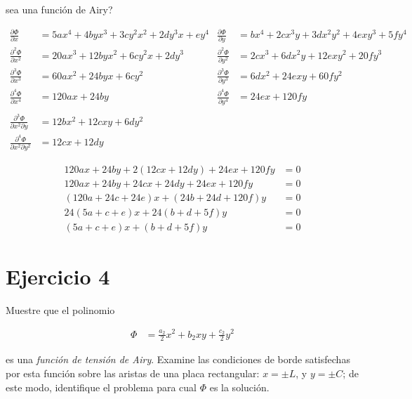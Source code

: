 \documentclass[a4paper,10pt,twoside,final,spanish]{article}
\begin{document}
\begin{enumerate}[a.]
sea una función de Airy?

\begin{tcolorbox}[colback=gray!10!white,colframe=black!0!white]

\begin{align*}
\frac{\partial\Phi}{\partial x} &= 5ax^{4}+4byx^{3}+3cy^{2}x^{2}+2dy^{3}x+ey^{4}
& \frac{\partial\Phi}{\partial y} &= bx^{4}+2cx^{3}y+3dx^{2}y^{2}+4exy^{3}+5fy^{4} \\
\frac{\partial^{2}\Phi}{\partial x^{2}} &= 20ax^{3}+12byx^{2}+6cy^{2}x+2dy^{3} 
& \frac{\partial^{2}\Phi}{\partial y^{2}} &= 2cx^{3}+6dx^{2}y+12exy^{2}+20fy^{3} \\
\frac{\partial^{3}\Phi}{\partial x^{3}} &= 60ax^{2}+24byx+6cy^{2}
& \frac{\partial^{3}\Phi}{\partial y^{3}} &= 6dx^{2}+24exy+60fy^{2} \\
\frac{\partial^{4}\Phi}{\partial x^{4}} &= 120ax+24by
& \frac{\partial^{4}\Phi}{\partial y^{4}} &= 24ex+120fy \\ \\
\frac{\partial^{3}\Phi}{\partial x^{2}\partial y} &= 12bx^{2}+12cxy+6dy^{2} \\
\frac{\partial^{4}\Phi}{\partial x^{2}\partial y^{2}} &= 12cx+12dy
\end{align*}


\begin{align*}
120ax+24by+2(12cx+12dy)+24ex+120fy &= 0 \\
120ax+24by+24cx+24dy+24ex+120fy    &= 0 \\
(120a+24c+24e)x+(24b+24d+120f)y    &= 0 \\
24(5a+c+e)x+24(b+d+5f)y            &= 0 \\
(5a+c+e)x+(b+d+5f)y                &= 0
\end{align*}

\end{tcolorbox}

\end{enumerate}

\section*{Ejercicio 4}

Muestre que el polinomio

\begin{align*}
\Phi &= \frac{a_{2}}{2}x^{2}+b_{2}xy+\frac{c_{2}}{2}y^2
\end{align*}

es una \textit{función de tensión de Airy}. Examine las condiciones de borde satisfechas por esta función sobre las aristas de una placa rectangular: $x=\pm L$, y $y=\pm C$; de este modo, identifique el problema para cual $\Phi$ es la solución. 
\end{document}
